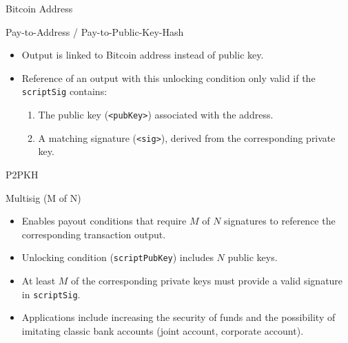 \documentclass[handout]{beamer}
\begin{document}
\begin{frame}{Bitcoin Address}
\begin{figure}[h!]
\center

\end{figure}
\end{frame}


\begin{frame}{Pay-to-Address / Pay-to-Public-Key-Hash}
\vspace{1em}
\begin{itemize}
	\item<2-> Output is linked to Bitcoin address instead of public key.
	\item<3-> Reference of an output with this unlocking condition only valid if the \texttt{scriptSig} contains:

	\begin{enumerate}
	 \item<4-> The public key (\texttt{<pubKey>}) associated with the address.
	 \item<4-> A matching signature (\texttt{<sig>}), derived from the corresponding private key.
	\end{enumerate}
\end{itemize}
\end{frame}


\begin{frame}{P2PKH}

\begin{figure}
\centering

\end{figure}

\end{frame}

\begin{frame}{Multisig (M of N)}
\vspace{1em}
\begin{itemize}
  \item Enables payout conditions that require $M$ of $N$ signatures to reference the corresponding transaction output.
  \item<2-> Unlocking condition (\texttt{scriptPubKey}) includes $N$ public keys.
  \item<3-> At least $M$ of the corresponding private keys must provide a valid signature in \texttt{scriptSig}.
  \item<4-> Applications include increasing the security of funds and the possibility of imitating classic bank accounts (joint account, corporate account).
\end{itemize}
\end{frame}
\end{document}
